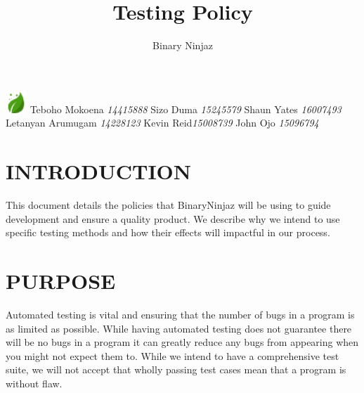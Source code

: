 \documentclass[12pt]{article}
\title{Testing Policy}
\author{Binary Ninjaz}
\date{}
\begin{document}
  \maketitle

\begin{flushright} \large
\includegraphics[width=30px]{leaf2}\emph{} \newline\newline 
Teboho Mokoena \emph{14415888} \newline
Sizo Duma \emph{15245579} \newline
Shaun Yates 	\emph{16007493} \newline
Letanyan Arumugam \emph{14228123} \newline
Kevin Reid\emph{15008739} \newline
John Ojo \emph{15096794} \newline
\end{flushright}
  \newpage
  
  \tableofcontents
  \newpage
  
  \section{INTRODUCTION}
  This document details the policies that BinaryNinjaz will be using to guide development and ensure a quality product. We describe why we intend to use specific testing methods and how their effects will impactful in our process. 
  
  \section{PURPOSE}
  Automated testing is vital and ensuring that the number of bugs in a program is as limited as possible. While having automated testing does not guarantee there will be no bugs in a program it can greatly reduce any bugs from appearing when you might not expect them to. While we intend to have a comprehensive test suite, we will not accept that wholly passing test cases mean that a program is without flaw.
\end{document}
